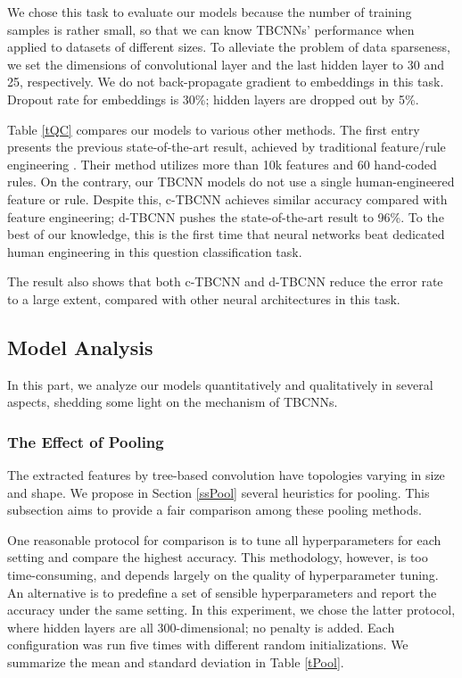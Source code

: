\documentclass[11pt,a4paper]{article}
\begin{document}
We chose this task to evaluate our models because the number of training samples is rather small,
so that we can know TBCNNs' performance when applied to datasets of different sizes.
To alleviate the problem of data sparseness,
we set the dimensions of convolutional layer and the last hidden layer to 30 and 25, respectively.
We do not back-propagate gradient to embeddings in this task.
Dropout rate for embeddings is 30\%; hidden layers are dropped out by 5\%.

Table \ref{tQC} compares our models to various other methods.
The first entry presents the previous state-of-the-art result,
achieved by traditional feature/rule engineering \cite{QC}. Their method
utilizes more than 10k features and 60 hand-coded rules.
On the contrary, our TBCNN models do not use a single human-engineered feature or rule.
Despite this, c-TBCNN achieves similar accuracy compared with feature engineering; d-TBCNN pushes the
state-of-the-art result to 96\%.
To the best of our knowledge, this is the first time that neural networks
beat dedicated human engineering in this question classification task.

The result also shows that both c-TBCNN and d-TBCNN reduce 
the error rate to a large extent, 
compared with other neural architectures in this task.

\subsection{Model Analysis}\label{ssModel}
In this part, we analyze our models quantitatively and qualitatively in several aspects,
shedding some light on the mechanism of TBCNNs.

\subsubsection{The Effect of Pooling}\label{sssPool}
The extracted features by tree-based convolution
have topologies varying in size and shape.
We propose in Section \ref{ssPool} several heuristics for pooling.
This subsection aims to provide a fair comparison among these pooling methods.

One reasonable protocol for comparison is to tune all hyperparameters for each setting and compare the
highest accuracy. This methodology, however, is too time-consuming, and
depends largely on the quality of hyperparameter tuning.
An alternative is to predefine a
set of sensible hyperparameters and report the accuracy under the same setting.
In this experiment, we chose the latter protocol,
where hidden layers are all 300-dimensional; no  penalty is added.
Each configuration was run five times with different random initializations. We summarize 
the mean and
standard deviation in Table \ref{tPool}.
\end{document}
